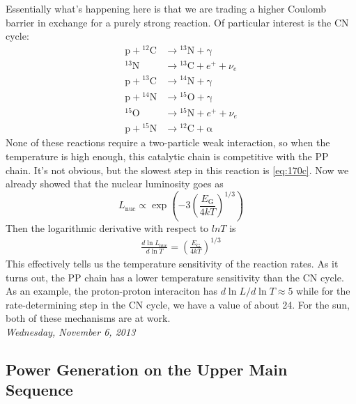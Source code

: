 \documentclass[10pt]{article}
\numberwithin{equation}{section}
\newcommand{\n}{\noindent}
\begin{document}
  Essentially what's happening here is that we are trading a higher
  Coulomb barrier in exchange for a purely strong reaction. Of
  particular interest is the CN cycle:
  \begin{align}
    \label{eq:170}
    \mathrm{p+{}^{12}C} & \to \mathrm{{}^{13}N+\gamma}\\
    \label{eq:170a}
    \mathrm{{}^{13}N} & \to \mathrm{{}^{13}C+}e^++\nu_e\\
    \label{eq:170b}
    \mathrm{p+{}^{13}C} &\to \mathrm{{}^{14}N+\gamma}\\
    \label{eq:170c}
    \mathrm{p+{}^{14}N} &\to \mathrm{{}^{15}O+\gamma}\\
    \label{eq:170d}
    \mathrm{{}^{15}O} &\to\mathrm{{}^{15}N}+e^++\nu_e\\
    \label{eq:170e}
    \mathrm{p+{}^{15}N} &\to\mathrm{{}^{12}C+\alpha}
  \end{align}
  None of these reactions require a two-particle weak interaction, so
  when the temperature is high enough, this catalytic chain is
  competitive with the PP chain. It's not obvious, but the slowest
  step in this reaction is \eqref{eq:170c}. Now we already showed that
  the nuclear luminosity goes as
  \begin{equation}
    \label{eq:171}
    L_{\mathrm{nuc}}\propto
    \exp\left(-3\left(\frac{E_{\mathrm{G}}}{4kT}\right)^{1/3}\right)
  \end{equation}
  Then the logarithmic derivative with respect to $ln T$ is
  \begin{align}
    \label{eq:172}
    \frac{d\ln L_{\mathrm{nuc}}}{d\ln T}=\left(\frac{E_{\mathrm{G}}}{4kT}
\right)^{1/3}
  \end{align}
  This effectively tells us the temperature sensitivity of the
  reaction rates. As it turns out, the PP chain has a lower
  temperature sensitivity than the CN cycle. As an example, the
  proton-proton interaciton has $d\ln L/d\ln T\approx 5$ while for the
  rate-determining step in the CN cycle, we have a value of about
  24. For the sun, both of these mechanisms are at work.\\

\n \textit{Wednesday, November 6, 2013}

  \subsection{Power Generation on the Upper Main Sequence}
  \label{sec:power-gener-upper}
\end{document}
